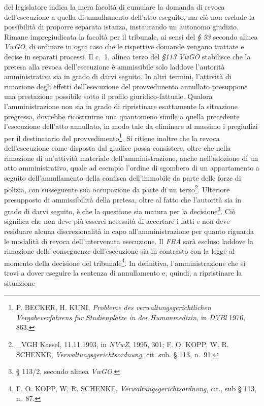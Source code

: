 \documentclass[12pt,it,a4paper,]{report}
\begin{document}
del legislatore indica la mera facoltà di cumulare la domanda di revoca
dell'esecuzione a quella di annullamento dell'atto eseguito, ma ciò non
esclude la possibilità di proporre separata istanza, instaurando un
autonomo giudizio. Rimane impregiudicata la facoltà per il tribunale, ai
sensi del \emph{§ 93} secondo alinea \emph{VwGO}, di ordinare in ogni
caso che le rispettive domande vengano trattate e decise in separati
processi. Il c.~1, alinea terzo del \emph{§113 VwGO} stabilisce che la
pretesa alla revoca dell'esecuzione è ammissibile solo laddove
l'autorità amministrativa sia in grado di darvi seguito. In altri
termini, l'attività di rimozione degli effetti dell'esecuzione del
provvedimento annullato presuppone una prestazione possibile sotto il
profilo giuridico-fattuale. Qualora l'amministrazione non sia in grado
di ripristinare esattamente la situazione pregressa, dovrebbe
ricostruirne una quantomeno simile a quella precedente l'esecuzione
dell'atto annullato, in modo tale da eliminare al massimo i pregiudizi
per il destinatario del provvedimento\footnote{P. BECKER, H. KUNI,
  \emph{Probleme des verwaltungsgerichtlichen Vergabeverfahrens für
  Studienplätze in der Humanmedizin,} in \emph{DVBl} 1976, 863.}. Si
ritiene inoltre che la revoca dell'esecuzione come disposta dal giudice
possa consistere, oltre che nella rimozione di un'attività materiale
dell'amministrazione, anche nell'adozione di un atto amministrativo,
quale ad esempio l'ordine di sgombero di un appartamento a seguito
dell'annullamento della confisca dell'immobile da parte delle forze di
polizia, con susseguente sua occupazione da parte di un
terzo\footnote{\_VGH Kassel, 11.11.1993, in \emph{NVwZ}, 1995, 301; F.
  O. KOPP, W. R. SCHENKE, \emph{Verwaltungsgerichtsordnung}, cit. sub. §
  113, n.~91.}. Ulteriore presupposto di ammissibilità della pretesa,
oltre al fatto che l'autorità sia in grado di darvi seguito, è che la
questione sia matura per la decisione\footnote{§ 113/2, secondo alinea
  \emph{VwGO}.}. Ciò significa che non deve più esserci necessità di
accertare i fatti e non deve residuare alcuna discrezionalità in capo
all'amministrazione per quanto riguarda le modalità di revoca
dell'intervenuta esecuzione. Il \emph{FBA} sarà escluso laddove la
rimozione delle conseguenze dell'esecuzione sia in contrasto con la
legge al momento della decisione del tribunale\footnote{F. O. KOPP, W.
  R. SCHENKE, \emph{Verwaltungsgerichtsordnung}, cit., sub § 113, n.~87.}.
In definitiva, l'amministrazione che si trovi a dover eseguire la
sentenza di annullamento e, quindi, a ripristinare la situazione
\end{document}
